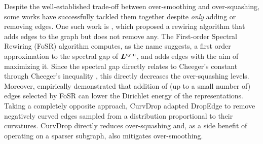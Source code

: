 Despite the well-established trade-off between over-smoothing and over-squashing, some works have successfully tackled them together despite \textit{only} adding or removing edges. One such work is \citet{karhadkar2023fosr}, which proposed a rewiring algorithm that adds edges to the graph but does not remove any. The First-order Spectral Rewiring (FoSR) algorithm computes, as the name suggests, a first order approximation to the spectral gap of $\bm{L}^{\text{sym}}$, and adds edges with the aim of maximizing it. Since the spectral gap directly relates to Cheeger's constant through Cheeger's inequality \citep{alon85,alon86,sinclair89}, this directly decreases the over-squashing levels. Moreover, \citet[Figure 5]{karhadkar2023fosr} empirically demonstrated that addition of (up to a small number of) edges selected by FoSR can lower the Dirichlet energy of the representations. Taking a completely opposite approach, CurvDrop \citep{liu2023curvdrop} adapted DropEdge to remove negatively curved edges sampled from a distribution proportional to their curvatures. CurvDrop directly reduces over-squashing and, as a side benefit of operating on a sparser subgraph, also mitigates over-smoothing.